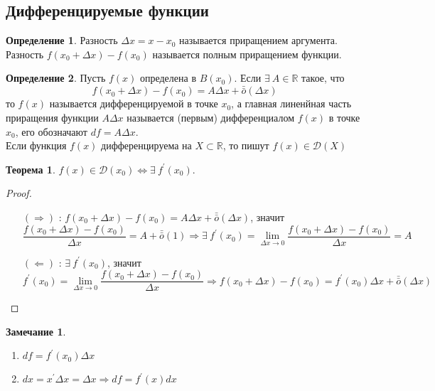 \documentclass[a4paper, 12pt]{article}
\newcommand{\R}{\mathbb{R}}
\newcommand\tab[1][.5cm]{\hspace*{#1}}
\theoremstyle{definition}
\newtheorem*{definition}{Определение}
\newtheorem*{theorem}{Теорема}
\newtheorem*{comm}{Замечание}
\begin{document}
    \subsection{Дифференцируемые функции}
        \begin{definition}
            Разность $\Delta x=x-x_0$ называется приращением аргумента. Разность $f(x_0+\Delta x)-f(x_0)$ называется полным приращением функции.
        \end{definition} 
        \begin{definition}
            Пусть $f(x)$ определена в $B(x_0)$. Если $\exists\ A\in \R$ такое, что
            \[f(x_0+\Delta x)-f(x_0)=A \Delta x+\bar{\bar{o}}{(\Delta x)}\]
            то $f(x)$ называется дифференцируемой в точке $x_0$, а главная линенйная часть приращения функции $A \Delta x$ называется (первым) дифференциалом $f(x)$ в точке $x_0$, его обозначают $df=A\Delta x$.\\
            Если функция $f(x)$ дифференцируема на $X\subset \R$, то пишут $f(x)\in \mathcal{D}(X)$
        \end{definition} 
        \begin{theorem}
            $f(x)\in \mathcal{D}(x_0) \Leftrightarrow \exists\ f^{\prime}(x_0)$.
        \end{theorem}
        \begin{proof}\tab
            \begin{itemize}
                \item[$(\Rightarrow)$]: $f(x_0+\Delta x)-f(x_0)=A\Delta x+\bar{\bar{o}}{(\Delta x)}$, значит
                \[\frac{f(x_0+\Delta x)-f(x_0)}{\Delta x}=A+\bar{\bar{o}}{(1)}\Rightarrow \exists\ f^{\prime}(x_0)=\lim\limits_{\Delta x\to 0}\frac{f(x_0+\Delta x)-f(x_0)}{\Delta x}=A\]
                \item[$(\Leftarrow)$]: $\exists\ f^{\prime}(x_0)$, значит
                \[f^{\prime}(x_0)=\lim\limits_{\Delta x\to 0} \frac{f(x_0+\Delta x)-f(x_0)}{\Delta x} \Rightarrow f(x_0+\Delta x)-f(x_0)=f^{\prime}(x_0)\Delta x+\bar{\bar{o}}{(\Delta x)}\] 
            \end{itemize}            
        \end{proof}  
        \begin{comm}\tab
            \begin{enumerate}
                \item $df=f^{\prime}(x_0)\Delta x$
                \item $dx=x^{\prime}\Delta x=\Delta x \Rightarrow df=f^{\prime}(x)dx$
            \end{enumerate}
        \end{comm}  
\end{document}
